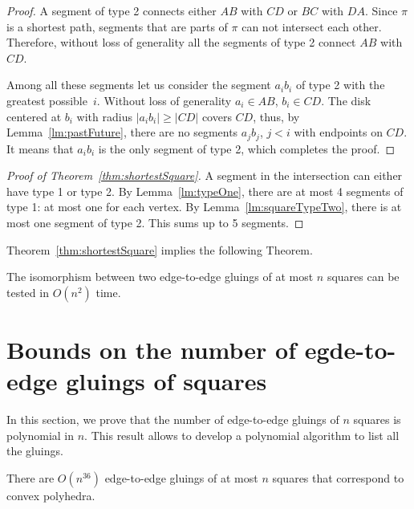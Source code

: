 \documentclass[a4paper,11pt]{article}
\begin{document}
\begin{proof} A segment of type 2 connects either $AB$ with $CD$ or $BC$ with $DA$. Since $\pi$ is a shortest path, segments that are parts of $\pi$ can not intersect each other. Therefore, without loss of generality all the segments of type 2 connect $AB$ with $CD$.
	
	Among all these segments let us consider the segment $a_ib_i$ of type 2 with the greatest possible~$i$. Without loss of generality $a_i \in AB$, $b_i \in CD$. The disk centered at $b_i$ with radius $|a_ib_i| \ge |CD|$ covers $CD$, thus, by Lemma~\ref{lm:pastFuture}, there are no segments $a_jb_j$, $j<i$ with endpoints on $CD$. It means that $a_ib_i$ is the only segment of type 2, which completes the proof.\end{proof}

\begin{proof}[Proof of Theorem~\ref{thm:shortestSquare}]
	A segment in the intersection can either have type 1 or type 2. By Lemma~\ref{lm:typeOne}, there are at most 4 segments of type 1: at most one for each vertex. By Lemma~\ref{lm:squareTypeTwo}, there is at most one segment of type 2. This sums up to 5 segments.\end{proof}

Theorem~\ref{thm:shortestSquare} implies the following Theorem.

\begin{theorem} \label{thm:chruntime}
	The isomorphism between two edge-to-edge gluings of at most $n$ squares can be tested in $O(n^2)$ time.
\end{theorem}

\section{Bounds on the number of egde-to-edge gluings of squares}

In this section, we prove that the number of edge-to-edge gluings of $n$ squares is polynomial in $n$. This result allows to develop a polynomial algorithm to list all the gluings.

\begin{theorem} \label{thm:n36}
	There are $O \left( n^{36} \right)$ edge-to-edge gluings of at most $n$ squares that correspond to convex polyhedra.
\end{theorem}
\end{document}
